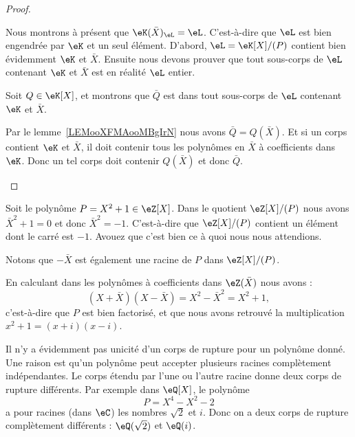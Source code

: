 \begin{proof}
\begin{subproof}
            Nous montrons à présent que \( \eK(\bar X)_{\eL}=\eL\). C'est-à-dire que \( \eL\) est bien engendrée par \( \eK\) et un seul élément. D'abord, \( \eL=\eK[X]/(P)\) contient bien évidemment \( \eK\) et \( \bar X\). Ensuite nous devons prouver que tout sous-corps de \( \eL\) contenant \( \eK\) et \( \bar X\) est en réalité \( \eL\) entier.

            Soit \( Q\in \eK[X]\), et montrons que \( \bar Q\) est dans tout sous-corps de \( \eL\) contenant \( \eK\) et \( \bar X\).

            Par le lemme~\ref{LEMooXFMAooMBgIrN} nous avons \( \bar Q=Q(\bar X)\). Et si un corps contient \( \eK\) et \( \bar X\), il doit contenir tous les polynômes en \( \bar X\) à coefficients dans \( \eK\). Donc un tel corps doit contenir \( Q(\bar X)\) et donc \( \bar Q\).

    \end{subproof}
\end{proof}

\begin{example}
    Soit le polynôme \( P=X^2+1\in \eZ[X]\). Dans le quotient \( \eZ[X]/(P)\) nous avons \( \bar X^2+1=0\) et donc \( \bar X^2=-1\). C'est-à-dire que \( \eZ[X]/(P)\) contient un élément dont le carré est \( -1\). Avouez que c'est bien ce à quoi nous nous attendions.

    Notons que \( -\bar X\) est également une racine de \( P\) dans \( \eZ[X]/(P)\).

    En calculant dans les polynômes à coefficients dans \( \eZ(\bar X)\) nous avons :
    \begin{equation}
        (X+\bar X)(X-\bar X)=X^2-\bar X^2=X^2+1,
    \end{equation}
    c'est-à-dire que \( P\) est bien factorisé, et que nous avons retrouvé la multiplication \( x^2+1=(x+i)(x-i)\).
\end{example}

\begin{normaltext}
    Il n'y a évidemment pas unicité d'un corps de rupture pour un polynôme donné. Une raison est qu'un polynôme peut accepter plusieurs racines complètement indépendantes. Le corps étendu par l'une ou l'autre racine donne deux corps de rupture différents. Par exemple dans \( \eQ[X]\), le polynôme
    \begin{equation}
        P=X^4-X^2-2
    \end{equation}
    a pour racines (dans \( \eC\)) les nombres \( \sqrt{ 2 }\) et \( i\). Donc on a deux corps de rupture complètement différents : \( \eQ(\sqrt{ 2 })\) et \( \eQ(i)\).
\end{normaltext}

